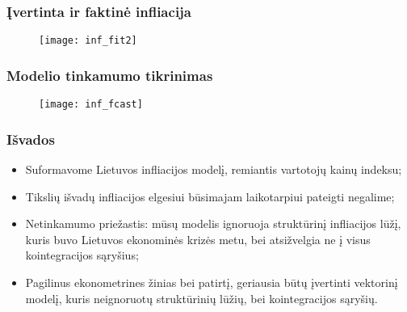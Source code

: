\documentclass[utf8x,hyperref={unicode}]{beamer}
\begin{document}
\begin{frame}
\frametitle{Įvertinta ir faktinė infliacija}

\begin{figure}[h!]
\center
\texttt{[image: inf\_fit2]}
\end{figure}

\end{frame}
\begin{frame}
\frametitle{Modelio tinkamumo tikrinimas}

\begin{figure}[h!]
\center
\texttt{[image: inf\_fcast]}
\end{figure}

\end{frame}

\begin{frame}

\frametitle{Išvados}

\begin{itemize}
\item{Suformavome Lietuvos infliacijos modelį, remiantis vartotojų kainų indeksu;}
\item{Tikslių išvadų infliacijos elgesiui būsimajam laikotarpiui pateigti negalime;}
\item{Netinkamumo priežastis: mūsų modelis ignoruoja struktūrinį infliacijos lūžį, kuris buvo Lietuvos ekonominės krizės metu, bei atsižvelgia ne į visus kointegracijos sąryšius;}
\item{Pagilinus ekonometrines žinias bei patirtį, geriausia būtų įvertinti vektorinį modelį, kuris neignoruotų struktūrinių lūžių, bei kointegracijos sąryšių.}
\end{itemize}

\end{frame}
\end{document}

